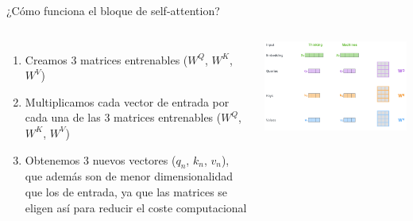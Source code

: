 \begin{frame}{¿Cómo funciona el bloque de self-attention?}

\begin{columns}
\begin{enumerate}
    \item Creamos 3 matrices entrenables ($W^Q$, $W^K$, $W^V$)
    \item Multiplicamos cada vector de entrada por cada una de las 3 matrices entrenables ($W^Q$, $W^K$, $W^V$) 
    \item Obtenemos 3 nuevos vectores ($q_n$, $k_n$, $v_n$), que además son de menor dimensionalidad que los de entrada, ya que las matrices se eligen así para reducir el coste computacional

\end{enumerate}

\includegraphics[width=\textwidth]{Slides/figures/02_Metodos_Generativos/trans-att2.png}

\end{columns}
\end{frame}


